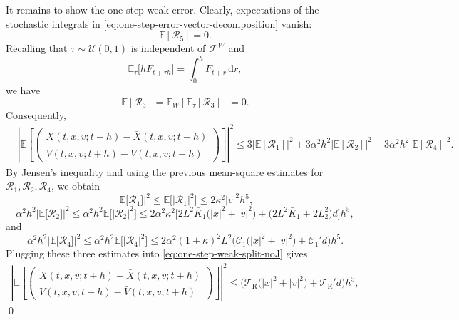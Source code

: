 \documentclass[12pt]{article}
\numberwithin{equation}{section}
\renewenvironment{proof}%
  {\begin{trivlist}%
   \item[]\ignorespaces}%
  {\qed\end{trivlist}}
\newcommand{\E}{\mathbb{E}}
\newcommand{\dd}{\mathrm{d}}
\begin{document}
\begin{proof}
It remains to show the one-step weak error. 
Clearly, expectations of the stochastic integrals in \eqref{eq:one-step-error-vector-decomposition} vanish:
\[
\mathbb E[\mathcal R_5]=0.
\]
Recalling that \(\tau\sim{\mathcal U}(0,1)\) is independent of $\mathcal{F}^W$ and 
\[
\mathbb E_{\tau}
\big[
hF_{t+\tau h}
\big]
=
\int_0^hF_{t+r}\,\dd r,
\]
we have
\[
\mathbb E[\mathcal R_3]=\E_W[\E_\tau[\mathcal{R}_3]]=0.
\]
Consequently,
\begin{equation}
\label{eq:one-step-weak-split-noJ}
\begin{aligned}
&
\left|
\mathbb E
\left[
\left(
\begin{aligned}
X(t,x,v;t+h)-\bar X(t,x,v;t+h)
\\
V(t,x,v;t+h)-\bar V(t,x,v;t+h)
\end{aligned}
\right)
\right]
\right|^2
\leq
3
\big|
\mathbb E[\mathcal R_1]
\big|^2
+
3\alpha^2h^2
\big|
\mathbb E[\mathcal R_2]
\big|^2
+
3\alpha^2h^2
\big|
\mathbb E[\mathcal R_4]
\big|^2 .
\end{aligned}
\end{equation}
By Jensen's inequality and using the previous mean-square estimates for \(\mathcal R_1,\mathcal R_2,\mathcal R_4\), we obtain
\[
\big|
\mathbb E
\big[ \mathcal R_1 \big]
\big|^2
\leq
\mathbb E
\Big[\big
|\mathcal R_1
\big|^2\Big]
\leq
2\kappa^2|v|^2h^5,
\]
\[
\alpha^2h^2
\big|
\mathbb E
\big[\mathcal R_2\big]
\big|^2
\leq
\alpha^2h^2
\mathbb E
\Big[\big|
\mathcal R_2
\big|^2\Big]
\leq
2\alpha^2\kappa^2
\Big[
2L^2\bar K_1
\big(
|x|^2+|v|^2
\big)
+
\big(
2L^2\bar K_1+2L_2^2
\big)d
\Big]h^5,
\]
and
\[
\alpha^2h^2
\big|
\mathbb E
\big[\mathcal R_4\big]
\big|^2
\leq
\alpha^2h^2
\mathbb E
\Big[\big
|\mathcal R_4
\big|^2\Big]
\leq
2\alpha^2(1+\kappa)^2L^2
\Big(
\mathcal C_1
\big(
|x|^2+|v|^2
\big)
+
\mathcal C_1'd
\Big)h^5.
\]
Plugging these three estimates into \eqref{eq:one-step-weak-split-noJ} gives
\begin{equation}
\label{eq:one-step-weak-square-final}
\begin{aligned}
\left|
\mathbb E
\left[
\left(
\begin{aligned}
X(t,x,v;t+h)-\bar X(t,x,v;t+h)
\\
V(t,x,v;t+h)-\bar V(t,x,v;t+h)
\end{aligned}
\right)
\right]
\right|^2
\leq
\Big(
\mathcal T_{\mathrm{R}}
\big(
|x|^2+|v|^2
\big)
+
\mathcal T_{\mathrm{R}}'d
\Big)h^5,
\end{aligned}

\end{equation}
\end{proof}
\end{document}
